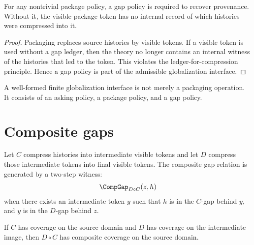 \begin{theorem}
\label{thm:gap-ledgers-not-optional-hardening}
For any nontrivial package policy, a gap policy is required to recover provenance. Without it, the visible package token has no internal record of which histories were compressed into it.
\end{theorem}

\begin{proof}
Packaging replaces source histories by visible tokens. If a visible token is used without a gap ledger, then the theory no longer contains an internal witness of the histories that led to the token. This violates the ledger-for-compression principle. Hence a gap policy is part of the admissible globalization interface.
\end{proof}

\begin{corollary}
\label{cor:globalization-has-three-layers}
A well-formed finite globalization interface is not merely a packaging operation. It consists of an asking policy, a package policy, and a gap policy.
\end{corollary}

\section{Composite gaps}

\begin{definition}
\label{def:hardening-composite-gap-ledger}
Let \(C\) compress histories into intermediate visible tokens and let \(D\) compress those intermediate tokens into final visible tokens. The composite gap relation is generated by a two-step witness:
$$
  \CompGap_{D\circ C}(z,h)
$$
when there exists an intermediate token \(y\) such that \(h\) is in the \(C\)-gap behind \(y\), and \(y\) is in the \(D\)-gap behind \(z\).
\end{definition}

\begin{theorem}
\label{thm:hardening-composite-coverage}
If \(C\) has coverage on the source domain and \(D\) has coverage on the intermediate image, then \(D\circ C\) has composite coverage on the source domain.
\end{theorem}

